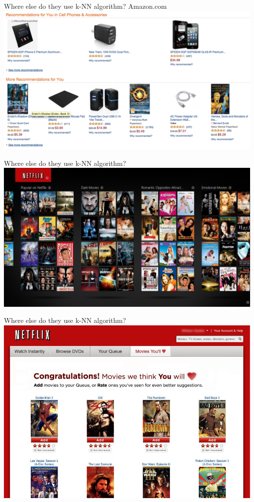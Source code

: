 \documentclass{beamer} %
\newcommand{\1}{\mathbb{1}}
\begin{document}
\begin{frame}[t]{Where else do they use k-NN algorithm?}
Amazon.com\\
\includegraphics[scale = 0.27]{./visualization/amazon.png}
\end{frame}

\begin{frame}[t]{Where else do they use k-NN algorithm?}
\includegraphics[scale = 0.17]{./visualization/netflix.jpg}
\end{frame}

\begin{frame}[t]{Where else do they use k-NN algorithm?}
\includegraphics[scale = 0.45]{./visualization/netflix2.jpg}
\end{frame}
\end{document}
